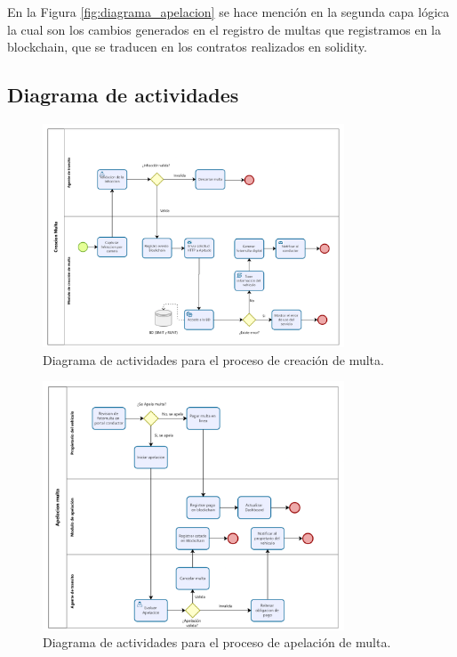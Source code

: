 En la Figura \ref{fig:diagrama_apelacion} se hace mención en la segunda capa lógica la cual son los cambios generados en el registro de multas que registramos en la blockchain, que se traducen en los contratos realizados en solidity.
\subsection{ Diagrama de actividades }
 \begin{figure}[htbp]
    \centering
    \includegraphics[width=0.8\textwidth]{Images/ActMulta.png}
    \caption{Diagrama de actividades para el proceso de creación de multa.}
    \label{fig:diagrama_creacion_multa}
\end{figure}
 \begin{figure}[htbp]
    \centering
    \includegraphics[width=0.8\textwidth]{Images/ActApelacion.png}
    \caption{Diagrama de actividades para el proceso de apelación de multa.}
    \label{fig:diagrama_apelacion_2}
\end{figure}

